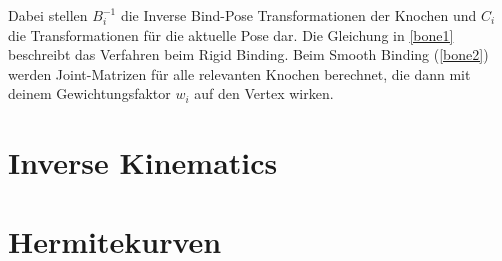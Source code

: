 Dabei stellen $B_{i}^{-1}$ die Inverse Bind-Pose Transformationen der Knochen und $C_{i}$ die Transformationen für die aktuelle Pose dar. Die Gleichung in \ref{bone1} beschreibt das Verfahren beim Rigid Binding. Beim Smooth Binding (\ref{bone2}) werden Joint-Matrizen für alle relevanten Knochen berechnet, die dann mit deinem Gewichtungsfaktor $w_{i}$ auf den Vertex wirken.

\section{Inverse Kinematics}

\section{Hermitekurven}